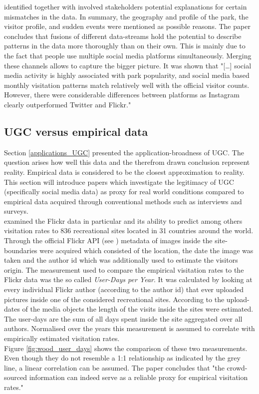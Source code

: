 \textcite{Tenkanen2017} identified together with involved stakeholders potential explanations for certain mismatches in the data. In summary, the geography and profile of the park, the visitor profile, and sudden events were mentioned as possible reasons. The paper concludes that fusions of different data-streams hold the potential to describe patterns in the data more thoroughly than on their own. This is mainly due to the fact that people use multiple social media platforms simultaneously. Merging these channels allows to capture the bigger picture.
It was shown that "[\dots] social media activity is highly associated with park popularity, and social media based monthly visitation patterns match relatively well with the official visitor counts. However, there were considerable differences between platforms as Instagram clearly outperformed Twitter and Flickr."\parencite[p.1]{Tenkanen2017}

\subsection{UGC versus empirical data} \label{ugc_vs_empirical}
Section \ref{applications_UGC} presented the application-broadness of UGC. The question arises how well this data and the therefrom drawn conclusion represent reality. Empirical data is considered to be the closest approximation to reality. This section will introduce papers which investigate the legitimacy of UGC (specifically social media data) as proxy for real world conditions compared to empirical data acquired through conventional methods such as interviews and surveys. \\

\textcite{Wood2013} examined the Flickr data in particular and its ability to predict among others visitation rates to 836 recreational sites located in 31 countries around the world. Through the official Flickr API (see ) metadata of images inside the site-boundaries were acquired which consisted of the location, the date the image was taken and the author id which was additionally used to estimate the visitors origin. The measurement used to compare the empirical visitation rates to the Flickr data was the so called \textit{User-Days per Year}. It was calculated by looking at every individual Flickr author (according to the author id) that ever uploaded pictures inside one of the considered recreational sites. According to the upload-dates of the media objects the length of the visits inside the sites were estimated. The user-days are the sum of all days spent inside the site aggregated over all authors. Normalised over the years this measurement is assumed to correlate with empirically estimated visitation rates. \\
Figure \ref{fig:wood_user_days} shows the comparison of these two measurements. Even though they do not resemble a 1:1 relationship as indicated by the grey line, a linear correlation can be assumed. The paper concludes that "the crowd-sourced information can indeed serve as a reliable proxy for empirical visitation rates." \parencite[p.1]{Wood2013}

